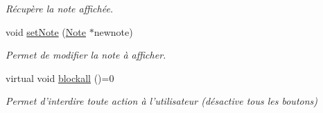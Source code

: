 \begin{DoxyCompactItemize}
\begin{DoxyCompactList}\small\item\em Récupère la note affichée. \end{DoxyCompactList}\item 
\hypertarget{class_note_editeur_a45a7b7dcc21f9fdd05c7b0f3ccf9c65c}{void \hyperlink{class_note_editeur_a45a7b7dcc21f9fdd05c7b0f3ccf9c65c}{set\-Note} (\hyperlink{class_note}{Note} $\ast$newnote)}\label{class_note_editeur_a45a7b7dcc21f9fdd05c7b0f3ccf9c65c}

\begin{DoxyCompactList}\small\item\em Permet de modifier la note à afficher. \end{DoxyCompactList}\item 
\hypertarget{class_note_editeur_aed73fd62ef4e6ea1b5db698f4a521354}{virtual void \hyperlink{class_note_editeur_aed73fd62ef4e6ea1b5db698f4a521354}{blockall} ()=0}\label{class_note_editeur_aed73fd62ef4e6ea1b5db698f4a521354}

\begin{DoxyCompactList}\small\item\em Permet d'interdire toute action à l'utilisateur (désactive tous les boutons) \end{DoxyCompactList}\end{DoxyCompactItemize}
